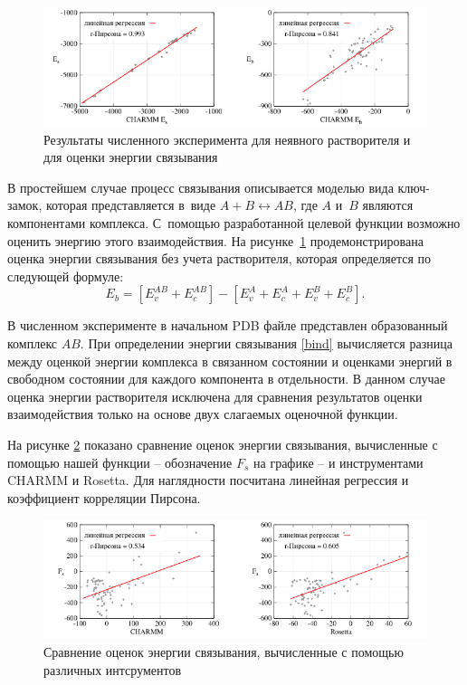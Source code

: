 \begin{figure}[h!]
	\centering
	\includegraphics[width=1.0\linewidth]{images/second.pdf}
	\caption{Результаты численного эксперимента для неявного растворителя и для оценки энергии связывания}
	\label{second}
\end{figure}

В простейшем случае процесс связывания описывается моделью вида ключ-замок, которая представляется в~виде $A+B\leftrightarrow AB$, где $A$ и~$B$ являются компонентами комплекса. С~помощью разработанной целевой функции возможно оценить энергию этого взаимодействия. На рисунке~\ref{second} продемонстрирована оценка энергии связывания без учета растворителя, которая определяется по следующей формуле:
\begin{equation}
	E_{b}=\left[E_{v}^{AB} + E_{c}^{AB}\right] - \left[E_{v}^{A} + E_{c}^{A} + E_{v}^{B} + E_{c}^{B}\right].
	\label{bind}
\end{equation}

В численном эксперименте в начальном PDB файле представлен образованный комплекс $AB$. При определении энергии связывания \eqref{bind} вычисляется разница между оценкой энергии комплекса в связанном состоянии и оценками энергий в свободном состоянии для каждого компонента в отдельности. В данном случае оценка энергии растворителя исключена для сравнения результатов оценки взаимодействия только на основе двух слагаемых оценочной функции.

На рисунке \ref{third} показано сравнение оценок энергии связывания, вычисленные с помощью нашей функции -- обозначение $F_s$ на графике -- и инструментами CHARMM и Rosetta. Для наглядности посчитана линейная регрессия и коэффициент корреляции Пирсона.

\begin{figure}[h!]
	\centering
	\includegraphics[width=1.0\linewidth]{images/third.pdf}
	\caption{Сравнение оценок энергии связывания, вычисленные с помощью различных интсрументов}
	\label{third}
\end{figure}

